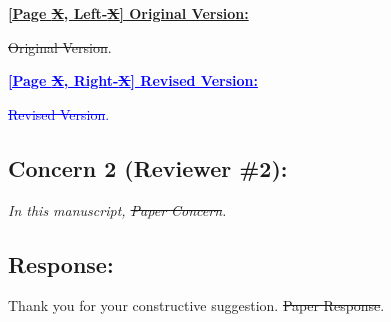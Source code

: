 \begin{tcolorbox}[colframe=black,colback=white,arc=0mm,boxrule=0.5mm, left=1mm, right=1mm, top=1mm, bottom=1mm, use color stack,breakable]

  \noindent \textbf{\underline{[Page \sout{X}, Left-\sout{X}] Original Version:}}

  \vspace{1mm}

  \noindent
  \sout{Original Version}.

  \hrulefill
  \vspace{1mm}

  \noindent \textbf{\textcolor{blue}{\underline{[Page \sout{X}, Right-\sout{X}] Revised Version:}}}

  \vspace{1mm}

  \noindent
  \textcolor{blue}{
    \sout{Revised Version}.
  }

\end{tcolorbox}

{}
\subsection*{Concern 2 (Reviewer \#2):}
\textit{In this manuscript, \sout{Paper Concern}.}

\subsection*{Response:}
Thank you for your constructive suggestion.
\sout{Paper Response}.


